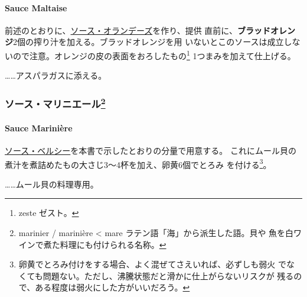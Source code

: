 \begin{recette}
\hypertarget{sauce-maltaise}{%
\paragraph{Sauce Maltaise}\label{sauce-maltaise}}


前述のとおりに、\protect\hyperlink{sauce-hollandaise}{ソース・オランデーズ}を作り、提供
直前に、\textbf{ブラッドオレンジ}2個の搾り汁を加える。ブラッドオレンジを用
いないとこのソースは成立しないので注意。オレンジの皮の表面をおろしたもの\footnote{zeste
  ゼスト。} 1つまみを加えて仕上げる。

\ldots{}\ldots{}アスパラガスに添える。

\maeaki

\hypertarget{ux30bdux30fcux30b9ux30deux30eaux30cbux30a8ux30fcux30eb72}{%
\subsubsection[ソース・マリニエール]{\texorpdfstring{ソース・マリニエール\footnote{marinier
  / marinière \textless{} mare ラテン語「海」から派生した語。貝や
  魚を白ワインで煮た料理にも付けられる名称。}}{ソース・マリニエール}}\label{ux30bdux30fcux30b9ux30deux30eaux30cbux30a8ux30fcux30eb72}}

\hypertarget{sauce-mariniere}{%
\paragraph{Sauce Marinière}\label{sauce-mariniere}}


\protect\hyperlink{sauce-bercy}{ソース・ベルシー}を本書で示したとおりの分量で用意する。
これにムール貝の煮汁を煮詰めたもの大さじ3〜4杯を加え、卵黄6個でとろみ
を付ける\footnote{卵黄でとろみ付けをする場合、よく混ぜてさえいれば、必ずしも弱火
  でなくても問題ない。ただし、沸騰状態だと滑かに仕上がらないリスクが
  残るので、ある程度は弱火にした方がいいだろう。}。

\ldots{}\ldots{}ムール貝の料理専用。

\maeaki

\hypertarget{ux767dux3044ux30bdux30fcux30b9ux30deux30c8ux30edux30c3ux30c874}{%
}
\end{recette}
